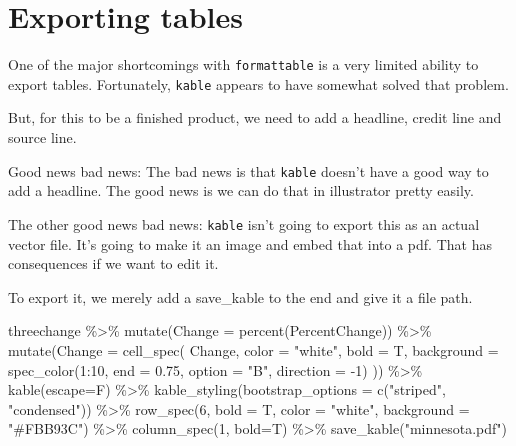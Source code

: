 \documentclass[
]{book}
\newenvironment{Shaded}{\begin{snugshade}}{\end{snugshade}}
\newcommand{\AttributeTok}[1]{\textcolor[rgb]{0.77,0.63,0.00}{#1}}
\newcommand{\DecValTok}[1]{\textcolor[rgb]{0.00,0.00,0.81}{#1}}
\newcommand{\FloatTok}[1]{\textcolor[rgb]{0.00,0.00,0.81}{#1}}
\newcommand{\FunctionTok}[1]{\textcolor[rgb]{0.00,0.00,0.00}{#1}}
\newcommand{\NormalTok}[1]{#1}
\newcommand{\SpecialCharTok}[1]{\textcolor[rgb]{0.00,0.00,0.00}{#1}}
\newcommand{\StringTok}[1]{\textcolor[rgb]{0.31,0.60,0.02}{#1}}
\begin{document}
\hypertarget{exporting-tables}{%
\section{Exporting tables}\label{exporting-tables}}

One of the major shortcomings with \texttt{formattable} is a very limited ability to export tables. Fortunately, \texttt{kable} appears to have somewhat solved that problem.

But, for this to be a finished product, we need to add a headline, credit line and source line.

Good news bad news: The bad news is that \texttt{kable} doesn't have a good way to add a headline. The good news is we can do that in illustrator pretty easily.

The other good news bad news: \texttt{kable} isn't going to export this as an actual vector file. It's going to make it an image and embed that into a pdf. That has consequences if we want to edit it.

To export it, we merely add a save\_kable to the end and give it a file path.

\begin{Shaded}
\begin{Highlighting}[]
\NormalTok{threechange }\SpecialCharTok{\%\textgreater{}\%} 
  \FunctionTok{mutate}\NormalTok{(}\AttributeTok{Change =} \FunctionTok{percent}\NormalTok{(PercentChange)) }\SpecialCharTok{\%\textgreater{}\%}
  \FunctionTok{mutate}\NormalTok{(}\AttributeTok{Change =} \FunctionTok{cell\_spec}\NormalTok{(}
\NormalTok{    Change, }\AttributeTok{color =} \StringTok{"white"}\NormalTok{, }\AttributeTok{bold =}\NormalTok{ T,}
    \AttributeTok{background =} \FunctionTok{spec\_color}\NormalTok{(}\DecValTok{1}\SpecialCharTok{:}\DecValTok{10}\NormalTok{, }\AttributeTok{end =} \FloatTok{0.75}\NormalTok{, }\AttributeTok{option =} \StringTok{"B"}\NormalTok{, }\AttributeTok{direction =} \SpecialCharTok{{-}}\DecValTok{1}\NormalTok{)}
\NormalTok{  )) }\SpecialCharTok{\%\textgreater{}\%}
  \FunctionTok{kable}\NormalTok{(}\AttributeTok{escape=}\NormalTok{F) }\SpecialCharTok{\%\textgreater{}\%} 
  \FunctionTok{kable\_styling}\NormalTok{(}\AttributeTok{bootstrap\_options =} \FunctionTok{c}\NormalTok{(}\StringTok{"striped"}\NormalTok{, }\StringTok{"condensed"}\NormalTok{)) }\SpecialCharTok{\%\textgreater{}\%}
  \FunctionTok{row\_spec}\NormalTok{(}\DecValTok{6}\NormalTok{, }\AttributeTok{bold =}\NormalTok{ T, }\AttributeTok{color =} \StringTok{"white"}\NormalTok{, }\AttributeTok{background =} \StringTok{"\#FBB93C"}\NormalTok{) }\SpecialCharTok{\%\textgreater{}\%}
  \FunctionTok{column\_spec}\NormalTok{(}\DecValTok{1}\NormalTok{, }\AttributeTok{bold=}\NormalTok{T) }\SpecialCharTok{\%\textgreater{}\%}
  \FunctionTok{save\_kable}\NormalTok{(}\StringTok{"minnesota.pdf"}\NormalTok{)}
\end{Highlighting}
\end{Shaded}
\end{document}
